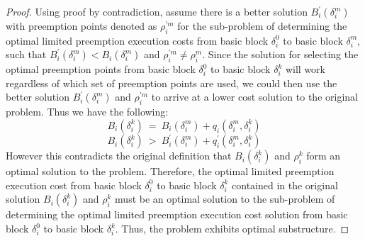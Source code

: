 \begin{proof}
Using proof by contradiction, assume there is a better solution $B_{i}^{'}(\delta_{i}^{m})$ with preemption points denoted as $\rho_{i}^{'m}$ for the sub-problem of determining the optimal limited preemption execution costs from basic block $\delta_{i}^{0}$ to basic block $\delta_{i}^{m}$, such that $B_{i}^{'}(\delta_{i}^{m}) < B_{i}(\delta_{i}^{m})$ and $\rho_{i}^{'m} \neq \rho_{i}^{m}$. Since the solution for selecting the optimal preemption points from basic block $\delta_{i}^{0}$ to basic block $\delta_{i}^{k}$ will work regardless of which set of preemption points are used, we could then use the better solution  $B_{i}^{'}(\delta_{i}^{m})$ and $\rho_{i}^{'m}$ to arrive at a lower cost solution to the original problem. Thus we have the following:
\begin{equation}\label{eqn:pcost-bb-1}
B_{i}(\delta_{i}^{k})\ =\ B_{i}(\delta_{i}^{m}) + q_{i}(\delta_{i}^{m},\delta_{i}^{k})
\end{equation}
\begin{equation}\label{eqn:pcost-bb-2}
B_{i}(\delta_{i}^{k})\ >\ B_{i}^{'}(\delta_{i}^{m}) + q_{i}^{'}(\delta_{i}^{m},\delta_{i}^{k})
\end{equation}
\noindent
However this contradicts the original definition that $B_{i}(\delta_{i}^{k})$ and $\rho_{i}^{k}$ form an optimal solution to the problem. Therefore, the optimal limited preemption execution cost from basic block $\delta_{i}^{0}$ to basic block $\delta_{i}^{k}$ contained in the original solution $B_{i}(\delta_{i}^{k})$ and $\rho_{i}^{k}$ must be an optimal solution to the sub-problem of determining the optimal limited preemption execution cost solution from basic block $\delta_{i}^{0}$ to basic block $\delta_{i}^{k}$. Thus, the problem exhibits optimal substructure.
\end{proof}

